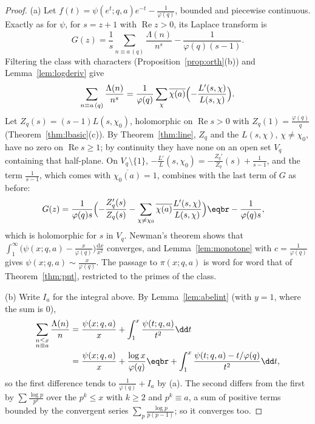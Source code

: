 \begin{proof}
(a) Let $f(t)=\psi(e^t;q,a)e^{-t}-\frac1{\varphi(q)}$, bounded and piecewise continuous. Exactly as for $\psi$, for $s=z+1$ with $\operatorname{Re}z>0$, its Laplace transform is
\[
G(z)=\frac1s\sum_{n\equiv a\,(q)}\frac{\Lambda(n)}{n^s}-\frac1{\varphi(q)(s-1)}.
\]
Filtering the class with characters (Proposition~\ref{prop:orth}(b)) and Lemma~\ref{lem:logderiv} give
\[
\sum_{n\equiv a\,(q)}\frac{\Lambda(n)}{n^s}=\frac1{\varphi(q)}\sum_\chi\overline{\chi(a)}\Bigl(-\frac{L'(s,\chi)}{L(s,\chi)}\Bigr).
\]
Let $Z_q(s)=(s-1)L(s,\chi_0)$, holomorphic on $\operatorname{Re}s>0$ with $Z_q(1)=\frac{\varphi(q)}q$ (Theorem~\ref{thm:lbasic}(c)). By Theorem~\ref{thm:line}, $Z_q$ and the $L(s,\chi)$, $\chi\ne\chi_0$, have no
zero on $\operatorname{Re}s\ge1$; by continuity they have none on an open set $V_q$ containing that half-plane. On $V_q\setminus\{1\}$, $-\frac{L'}L(s,\chi_0)=-\frac{Z_q'}{Z_q}(s)+\frac1{s-1}$, and the
term $\frac1{s-1}$, which comes with $\overline{\chi_0(a)}=1$, combines with the last term of $G$ as before:
\[
\begin{aligned}G(z)&=\frac1{\varphi(q)s}\Bigl(-\frac{Z_q'(s)}{Z_q(s)}-\sum_{\chi\ne\chi_0}\overline{\chi(a)}\frac{L'(s,\chi)}{L(s,\chi)}\Bigr)\eqbr-\frac1{\varphi(q)s},\end{aligned}
\]
which is holomorphic for $s$ in $V_q$. Newman's theorem shows that $\int_1^\infty\bigl(\psi(x;q,a)-\frac x{\varphi(q)}\bigr)\frac{\mathrm dx}{x^2}$ converges, and Lemma~\ref{lem:monotone} with
$c=\frac1{\varphi(q)}$ gives $\psi(x;q,a)\sim\frac x{\varphi(q)}$. The passage to $\pi(x;q,a)$ is word for word that of Theorem~\ref{thm:pnt}, restricted to the primes of the class.

(b) Write $I_a$ for the integral above. By Lemma~\ref{lem:abelint} (with $y=1$, where the sum is $0$),
\[
\begin{aligned}\sum_{\substack{n\le x\\n\equiv a}}\frac{\Lambda(n)}n&=\frac{\psi(x;q,a)}x+\int_1^x\frac{\psi(t;q,a)}{t^2}\dd t\\&=\frac{\psi(x;q,a)}x+\frac{\log x}{\varphi(q)}\eqbr+\int_1^x\frac{\psi(t;q,a)-t/\varphi(q)}{t^2}\dd t,\end{aligned}
\]
so the first difference tends to $\frac1{\varphi(q)}+I_a$ by (a). The second differs from the first by $\sum\frac{\log p}{p^k}$ over the $p^k\le x$ with $k\ge2$ and $p^k\equiv a$, a sum of positive
terms bounded by the convergent series $\sum_p\frac{\log p}{p(p-1)}$; so it converges too.
\end{proof}

